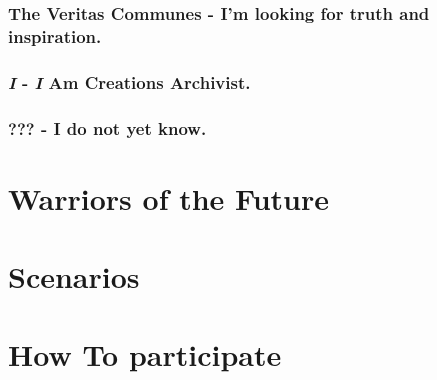 \documentclass[a4paper,12pt]{book}
\begin{document}
\subsection{The  Veritas Communes - I'm looking for truth and inspiration. }

\subsection{\textit{I} - \textit{I} Am Creations Archivist.}

\subsection{??? - I do not yet know.}

\chapter{Warriors of the Future}

\chapter{Scenarios}

\chapter{How To participate}
\end{document}
